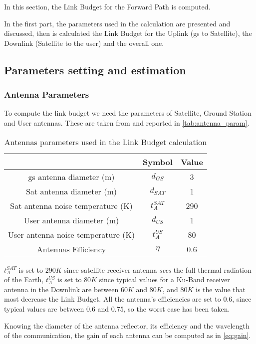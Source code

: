 In this section, the Link Budget for the Forward Path is computed.

In the first part, the parameters used in the calculation are presented and discussed, then is calculated the Link Budget for the Uplink (\gls{gs} to Satellite), the Downlink (Satellite to the user) and the overall one.
\subsection{Parameters setting and estimation}
	\subsubsection{Antenna Parameters}
		To compute the link budget we need the parameters of Satellite, Ground Station and User antennas. These are taken from \cite{Ippolito17} and reported in \autoref{tab:antenna_param}.

		\begin{table}[h]
			\centering
			\begin{tabular}{ccc}
			\toprule
			& Symbol & Value\\
			\midrule
			\gls{gs} antenna diameter (m) & $d_{GS}$ & 3\\
			Sat antenna diameter (m) & $d_{SAT}$  & 1\\
			Sat antenna noise temperature (K)& $t_A^{SAT}$ & 290\\
			User antenna diameter (m)& $d_{US}$ & 1\\
			User antenna noise temperature (K)& $t_A^{US}$ & 80\\
			Antennas Efficiency & $\eta$ & 0.6\\
			\bottomrule
			\end{tabular}
			\caption{Antennas parameters used in the Link Budget calculation}
			\label{tab:antenna_param}
		\end{table}

		$t_A^{SAT}$ is set to $290K$ since satellite receiver antenna \textit{sees} the full thermal radiation of the Earth, $t_A^{US}$ is set to $80K$ since typical values for a Ku-Band receiver antenna in the Downlink are between $60K$ and $80K$, and $80K$ is the value that most decrease the Link Budget.
		All the antenna's efficiencies are set to $0.6$, since typical values are between $0.6$ and $0.75$, so the worst case has been taken.

		Knowing the diameter of the antenna reflector, its efficiency and the wavelength of the communication, the gain of each antenna can be computed as in \autoref{eq:gain}.


